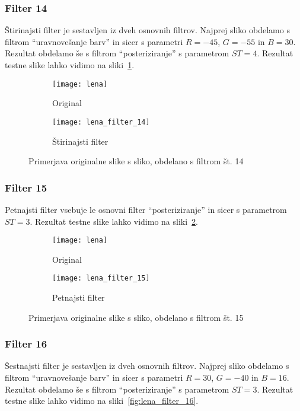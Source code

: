 \subsubsection*{Filter 14}
Štirinajsti filter je sestavljen iz dveh osnovnih filtrov. Najprej sliko obdelamo s
filtrom ``uravnovešanje barv'' in sicer s parametri $R = -45$, $G = -55$ in
$B = 30$. Rezultat obdelamo še s filtrom ``posteriziranje'' s parametrom
$ST =4$. Rezultat testne slike lahko vidimo na sliki~\ref{fig:lena_filter_14}.

\begin{figure}[!ht]
    \centering
    \begin{subfigure}[b]{0.4\textwidth}
        \texttt{[image: lena]}
        \caption{Original}
    \end{subfigure}
    \begin{subfigure}[b]{0.4\textwidth}
        \texttt{[image: lena\_filter\_14]}
        \caption{Štirinajsti filter}
    \end{subfigure}
    \caption{Primerjava originalne slike s sliko, obdelano s filtrom št. 14}
    \label{fig:lena_filter_14}
\end{figure}


\subsubsection*{Filter 15}
Petnajsti filter vsebuje le osnovni filter ``posteriziranje'' in sicer s parametrom
$ST = 3$. Rezultat testne slike lahko vidimo na sliki~\ref{fig:lena_filter_15}.

\begin{figure}[!ht]
    \centering
    \begin{subfigure}[b]{0.4\textwidth}
        \texttt{[image: lena]}
        \caption{Original}
    \end{subfigure}
    \begin{subfigure}[b]{0.4\textwidth}
        \texttt{[image: lena\_filter\_15]}
        \caption{Petnajsti filter}
    \end{subfigure}
    \caption{Primerjava originalne slike s sliko, obdelano s filtrom št. 15}
    \label{fig:lena_filter_15}
\end{figure}


\subsubsection*{Filter 16}
Šestnajsti filter je sestavljen iz dveh osnovnih filtrov. Najprej sliko obdelamo s
filtrom ``uravnovešanje barv'' in sicer s parametri $R = 30$, $G = -40$ in
$B = 16$. Rezultat obdelamo še s filtrom ``posteriziranje'' s parametrom
$ST =3$. Rezultat testne slike lahko vidimo na sliki~\ref{fig:lena_filter_16}.

